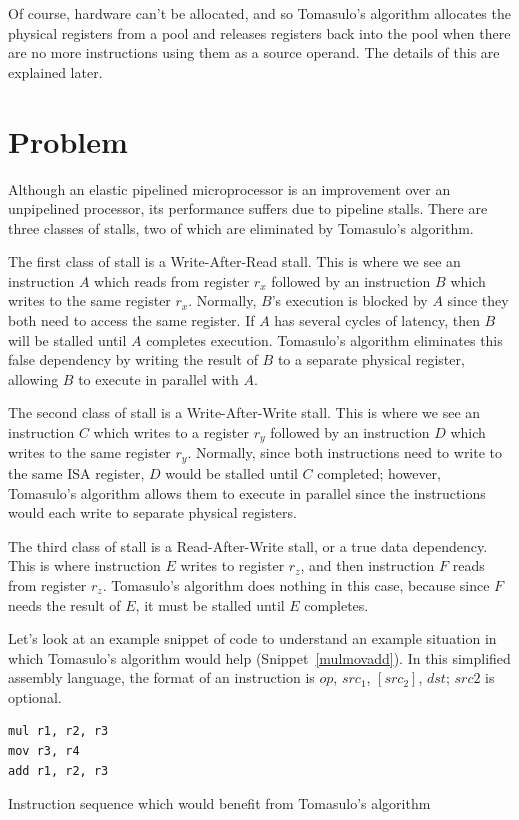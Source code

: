 \documentclass[12pt]{article}
\begin{document}
Of course, hardware can't be allocated, and so Tomasulo's algorithm allocates the physical registers from a pool and releases registers back into the pool when there are
no more instructions using them as a source operand. The details of this are explained later.

\section{Problem\label{sec:problem}}
Although an elastic pipelined microprocessor is an improvement over an unpipelined processor, its performance suffers due to pipeline stalls.
There are three classes of stalls, two of which are eliminated by Tomasulo's algorithm.

The first class of stall is a Write-After-Read stall. This is where we see an instruction $A$ which reads from register $r_x$ followed by an instruction
$B$ which writes to the same register $r_x$. Normally, $B$'s execution is blocked by $A$ since they both need to access the same register. If $A$ has
several cycles of latency, then $B$ will be stalled until $A$ completes execution. Tomasulo's algorithm eliminates this false dependency by writing the
result of $B$ to a separate physical register, allowing $B$ to execute in parallel with $A$.

The second class of stall is a Write-After-Write stall. This is where we see an instruction $C$ which writes to a register $r_y$ followed by an instruction
$D$ which writes to the same register $r_y$. Normally, since both instructions need to write to the same ISA register, $D$ would be stalled until $C$ completed;
however, Tomasulo's algorithm allows them to execute in parallel since the instructions would each write to separate physical registers.

The third class of stall is a Read-After-Write stall, or a true data dependency. This is where instruction $E$ writes to register $r_z$, and then instruction $F$
reads from register $r_z$. Tomasulo's algorithm does nothing in this case, because since $F$ needs the result of $E$, it must be stalled until $E$ completes.

Let's look at an example snippet of code to understand an example situation in which Tomasulo's algorithm would help (Snippet~\ref{mulmovadd}).
In this simplified assembly language, the format of an instruction is $op$, $src_1$, $\left[src_2\right]$, $dst$; $src2$ is optional.

\begin{snippet}
\begin{verbatim}
mul r1, r2, r3
mov r3, r4
add r1, r2, r3
\end{verbatim}
\caption{Instruction sequence which would benefit from Tomasulo's algorithm}
\label{mulmovadd}
\end{snippet}
\end{document}
